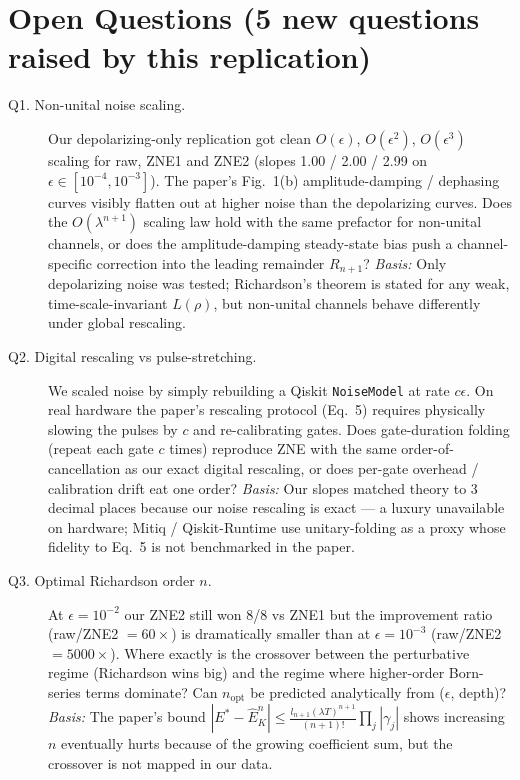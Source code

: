 \section*{Open Questions (5 new questions raised by this replication)}

\begin{description}
  \item[Q1. Non-unital noise scaling.] Our depolarizing-only replication got clean $O(\epsilon)$, $O(\epsilon^2)$, $O(\epsilon^3)$ scaling for raw, ZNE1 and ZNE2 (slopes 1.00 / 2.00 / 2.99 on $\epsilon \in [10^{-4}, 10^{-3}]$). The paper's Fig.~1(b) amplitude-damping / dephasing curves visibly flatten out at higher noise than the depolarizing curves. Does the $O(\lambda^{n+1})$ scaling law hold with the same prefactor for non-unital channels, or does the amplitude-damping steady-state bias push a channel-specific correction into the leading remainder $R_{n+1}$?
  \emph{Basis:} Only depolarizing noise was tested; Richardson's theorem is stated for any weak, time-scale-invariant $L(\rho)$, but non-unital channels behave differently under global rescaling.
  \item[Q2. Digital rescaling vs pulse-stretching.] We scaled noise by simply rebuilding a Qiskit \verb|NoiseModel| at rate $c\epsilon$. On real hardware the paper's rescaling protocol (Eq.~5) requires physically slowing the pulses by $c$ and re-calibrating gates. Does gate-duration folding (repeat each gate $c$ times) reproduce ZNE with the same order-of-cancellation as our exact digital rescaling, or does per-gate overhead / calibration drift eat one order?
  \emph{Basis:} Our slopes matched theory to 3 decimal places because our noise rescaling is exact — a luxury unavailable on hardware; Mitiq / Qiskit-Runtime use unitary-folding as a proxy whose fidelity to Eq.~5 is not benchmarked in the paper.
  \item[Q3. Optimal Richardson order $n$.] At $\epsilon = 10^{-2}$ our ZNE2 still won 8/8 vs ZNE1 but the improvement ratio (raw/ZNE2 $= 60\times$) is dramatically smaller than at $\epsilon = 10^{-3}$ (raw/ZNE2 $= 5000\times$). Where exactly is the crossover between the perturbative regime (Richardson wins big) and the regime where higher-order Born-series terms dominate? Can $n_{\text{opt}}$ be predicted analytically from ($\epsilon$, depth)?
  \emph{Basis:} The paper's bound $|E^* - \hat{E}^n_K| \le \tfrac{l_{n+1}(\lambda T)^{n+1}}{(n+1)!}\prod_j |\gamma_j|$ shows increasing $n$ eventually hurts because of the growing coefficient sum, but the crossover is not mapped in our data.

\end{description}

